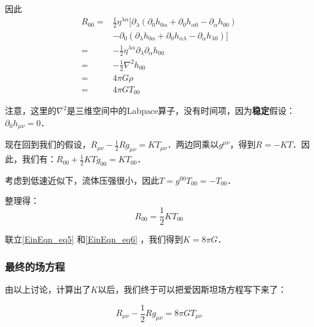 因此
\begin{equation}\label{EinEqn_eq5}
\begin{aligned}
R_{00}=&\frac{1}{2}\eta^{\lambda\alpha}[\partial_\lambda(\partial_0 h_{0 \alpha}+\partial_0 h_{\alpha0}-\partial_\alpha h_{00})\\
&-\partial_0(\partial_\lambda h_{0\alpha}+\partial_0 h_{\alpha\lambda}-\partial_\alpha h_{\lambda0})]\\
=&-\frac{1}{2}\eta^{\lambda\alpha}\partial_\lambda\partial_\alpha h_{00}\\
=&-\frac{1}{2}\nabla^2 h_{00}\\
=&4\pi G\rho\\
=&4\pi GT_{00}
\end{aligned}
\end{equation}

注意，这里的$\nabla^2$是三维空间中的Labpace算子，没有时间项，因为\textbf{稳定}假设：$\partial_0h_{\mu\nu}=0$．


现在回到我们的假设，$R_{\mu\nu}-\frac{1}{2}Rg_{\mu\nu}=KT_{\mu\nu}$．两边同乘以$g^{\mu\nu}$，得到$R=-KT$．因此，我们有：$R_{00}+\frac{1}{2}KTg_{00}=KT_{00}$．

考虑到低速近似下，流体压强很小，因此$T=g^{00}T_{00}=-T_{00}$．

整理得：
\begin{equation}\label{EinEqn_eq6}
R_{00}=\frac{1}{2}KT_{00}
\end{equation}

联立\autoref{EinEqn_eq5} 和\autoref{EinEqn_eq6} ，我们得到$K=8\pi G$．

\subsubsection{最终的场方程}

由以上讨论，计算出了$K$以后，我们终于可以把爱因斯坦场方程写下来了：

\begin{equation}
R_{\mu\nu}-\frac{1}{2}Rg_{\mu\nu}=8\pi GT_{\mu\nu}
\end{equation}















